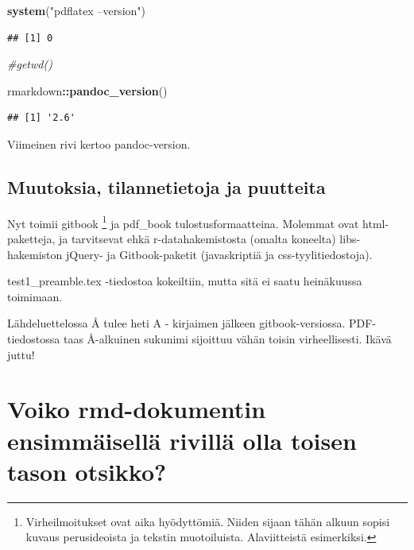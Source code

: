 \documentclass[finnish,]{book}
\newenvironment{Shaded}{\begin{snugshade}}{\end{snugshade}}
\newcommand{\CommentTok}[1]{\textcolor[rgb]{0.56,0.35,0.01}{\textit{#1}}}
\newcommand{\KeywordTok}[1]{\textcolor[rgb]{0.13,0.29,0.53}{\textbf{#1}}}
\newcommand{\NormalTok}[1]{#1}
\newcommand{\OperatorTok}[1]{\textcolor[rgb]{0.81,0.36,0.00}{\textbf{#1}}}
\newcommand{\StringTok}[1]{\textcolor[rgb]{0.31,0.60,0.02}{#1}}
\let\rmarkdownfootnote\footnote%
\def\footnote{\protect\rmarkdownfootnote}
\begin{document}
\begin{Shaded}
\begin{Highlighting}[]
\KeywordTok{system}\NormalTok{(}\StringTok{"pdflatex --version"}\NormalTok{)}
\end{Highlighting}
\end{Shaded}

\begin{verbatim}
## [1] 0
\end{verbatim}

\begin{Shaded}
\begin{Highlighting}[]
\CommentTok{#getwd()}

\NormalTok{rmarkdown}\OperatorTok{::}\KeywordTok{pandoc_version}\NormalTok{()}
\end{Highlighting}
\end{Shaded}

\begin{verbatim}
## [1] '2.6'
\end{verbatim}

Viimeinen rivi kertoo pandoc-version.

\hypertarget{muutoksia-tilannetietoja-ja-puutteita}{%
\section{Muutoksia, tilannetietoja ja puutteita}\label{muutoksia-tilannetietoja-ja-puutteita}}

Nyt toimii gitbook \footnote{Virheilmoitukset ovat aika hyödyttömiä. Niiden sijaan tähän alkuun sopisi kuvaus perusideoista ja tekstin muotoiluista. Alaviitteistä esimerkiksi.} ja pdf\_book tulostusformaatteina. Molemmat ovat html-paketteja, ja tarvitsevat ehkä r-datahakemistosta (omalta koneelta) libs-hakemiston jQuery- ja Gitbook-paketit (javaskriptiä ja css-tyylitiedostoja).

test1\_preamble.tex -tiedostoa kokeiltiin, mutta sitä ei saatu heinäkuussa toimimaan.

Lähdeluettelossa Å tulee heti A - kirjaimen jälkeen gitbook-versiossa. PDF-tiedostossa taas Å-alkuinen sukunimi sijoittuu vähän toisin virheellisesti. Ikävä juttu!

\hypertarget{voiko-rmd-dokumentin-ensimmaisella-rivilla-olla-toisen-tason-otsikko}{%
\chapter{Voiko rmd-dokumentin ensimmäisellä rivillä olla toisen tason otsikko?}\label{voiko-rmd-dokumentin-ensimmaisella-rivilla-olla-toisen-tason-otsikko}}
\end{document}
